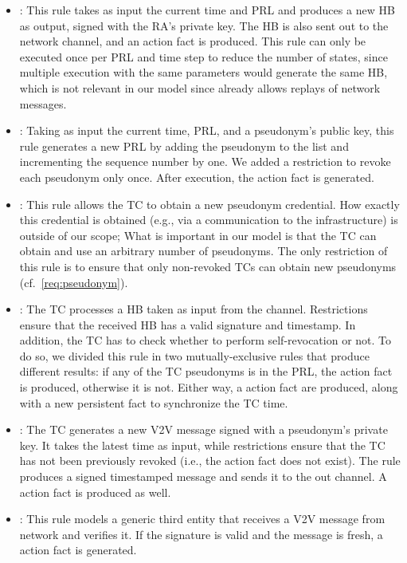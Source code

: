 \begin{itemize}
    \item {}: This rule takes as input the
    current time and \ac{PRL} and produces a new \ac{HB} as output, signed
    with the \ac{RA}'s private key. The \ac{HB} is also sent out to the network
    channel, and an action fact  is produced.
    This rule can only be executed once per \ac{PRL} and time step to reduce
    the number of states, since multiple execution with the same parameters
    would generate the same \ac{HB}, which is not relevant in our model since
    \tamarin{} already allows replays of network messages.
    \item {}: Taking as input the current
    time, \ac{PRL}, and a pseudonym's public key, this rule generates a
    new \ac{PRL} by adding the pseudonym to the list and incrementing the
    sequence number by one. We added a restriction to revoke each pseudonym only
    once. After execution, the action fact  is
    generated.
    \item {}: This rule allows the \ac{TC} to obtain a
    new pseudonym credential. How exactly this credential is obtained (e.g., via
    a communication to the infrastructure) is outside of our scope; What is
    important in our model is that the \ac{TC} can obtain and use an arbitrary
    number of pseudonyms. The only restriction of this rule is to ensure that
    only non-revoked \acp{TC} can obtain new pseudonyms
    (cf.~\cref{req:pseudonym}).
    \item {}: The \ac{TC} processes a \ac{HB}
    taken as input from the channel. Restrictions ensure that the received
    \ac{HB} has a valid signature and timestamp. In addition, the \ac{TC} has to
    check whether to perform self-revocation or not. To do so, we divided this
    rule in two mutually-exclusive rules that produce different results: if any
    of the \ac{TC} pseudonyms is in the \ac{PRL}, the action fact
     is produced, otherwise it is not. Either way, a
     action fact are produced, along with a
    new  persistent fact to synchronize the \ac{TC} time.
    \item {}: The \ac{TC} generates a new \ac{V2V}
    message signed with a pseudonym's private key. It takes the latest time as
    input, while restrictions ensure that the TC has not been previously revoked
    (i.e., the  action fact does not exist). The rule
    produces a signed timestamped message and sends it to the out channel. A
     action fact is produced as well.
    \item {}: This rule models a generic third entity
    that receives a \ac{V2V} message from network and verifies it. If the
    signature is valid and the message is fresh, a
     action fact is generated.
\end{itemize}

